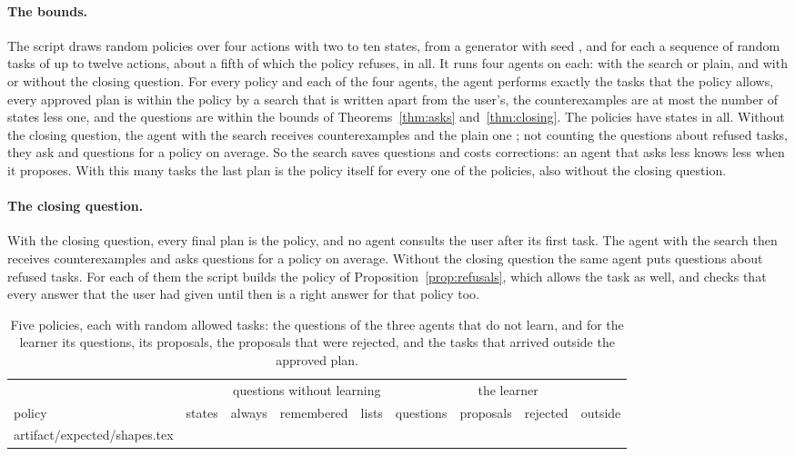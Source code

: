 \documentclass[acmsmall,nonacm,screen]{acmart}
\makeatletter
\newcommand{\claim}[2]{#2}
\newcommand{\rows}[1]{\@@input artifact/expected/#1.tex }
\makeatother
\begin{document}
\paragraph{The bounds.} The script draws \exPolicies{} random policies over four actions with
two to ten states, from a generator with seed \exSeed{}, and for each a sequence of
\exTasksEach{} random tasks of up to twelve actions, about a fifth of which the policy
refuses, \exRefusals{} in all. It runs four agents on each: with the search or plain, and
with or without the closing question. \claim{bounds}{For every policy and each of the four
agents, the agent performs exactly the tasks that the policy allows, every approved plan is
within the policy by a search that is written apart from the user's, the counterexamples are
at most the number of states less one, and the questions are within the bounds of
Theorems~\ref{thm:asks} and~\ref{thm:closing}.} The policies have \exStatesAll{} states in
all. Without the closing question, the agent with the search receives \exExamples{}
counterexamples and the plain one \exExamplesPlain{}; not counting the questions about
refused tasks, they ask \exAskedMean{} and \exAskedMeanPlain{} questions for a policy on
average. So the search saves questions and costs corrections: an agent that asks less knows
less when it proposes. \claim{exact}{With this many tasks the last plan is the policy itself
for every one of the policies, also without the closing question.}

\paragraph{The closing question.} \claim{closing}{With the closing question, every final
plan is the policy, and no agent consults the user after its first task.} The agent with the
search then receives \exExamplesClosing{} counterexamples and asks \exAskedMeanClosing{}
questions for a policy on average. \claim{refusals-cost}{Without the closing question the
same agent puts \exPaid{} questions about refused tasks. For each of them the script builds
the policy of Proposition~\ref{prop:refusals}, which allows the task as well, and checks that
every answer that the user had given until then is a right answer for that policy too.}

\begin{table}
\caption{Five policies, each with \exShapeTasks{} random allowed tasks: the questions of the
three agents that do not learn, and for the learner its questions, its proposals, the
proposals that were rejected, and the tasks that arrived outside the approved plan.}
\label{tab:shapes}
\small
\setlength{\tabcolsep}{4pt}
\begin{tabular}{lrrrrrrrr}
\toprule
 & & \multicolumn{3}{c}{questions without learning} & \multicolumn{4}{c}{the learner} \\
policy & states & always & remembered & lists & questions & proposals & rejected & outside \\
\midrule
\rows{shapes}
\bottomrule
\end{tabular}
\end{table}
\end{document}
